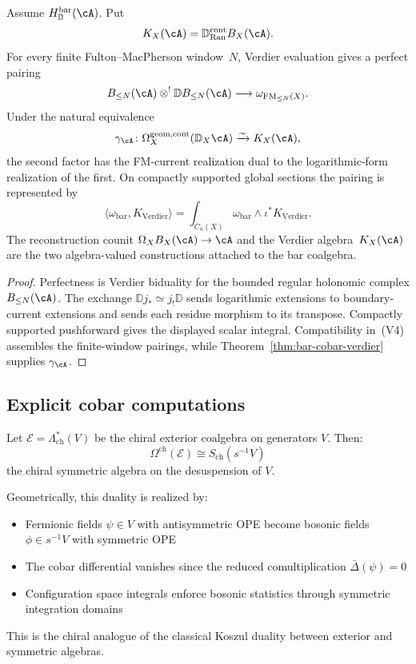 \begin{theorem}\label{thm:poincare-verdier}
Assume $H_{\mathbb D}^{\mathrm{bar}}(\cA)$.  Put
\[
K_X(\cA)=\mathbb D_{\operatorname{Ran}}^{\mathrm{cont}}B_X(\cA).
\]
For every finite Fulton--MacPherson window~$N$, Verdier evaluation gives
a perfect pairing
\[
B_{\leq N}(\cA)\otimes^!
\mathbb D B_{\leq N}(\cA)\longrightarrow
\omega_{\mathrm{FM}_{\leq N}(X)}.
\]
Under the natural equivalence
\[
\gamma_\cA\colon
\Omega_X^{\mathrm{geom,cont}}(\mathbb D_X\cA)
\xrightarrow{\sim}K_X(\cA),
\]
the second factor has the FM-current realization dual to the
logarithmic-form realization of the first.  On compactly supported
global sections the pairing is represented by
\[
\langle\omega_{\mathrm{bar}},K_{\mathrm{Verdier}}\rangle
=\int_{\overline C_n(X)}
\omega_{\mathrm{bar}}\wedge\iota^*K_{\mathrm{Verdier}}.
\]
The reconstruction counit
$\Omega_XB_X(\cA)\to\cA$ and the Verdier algebra~$K_X(\cA)$ are the
two algebra-valued constructions attached to the bar coalgebra.
\end{theorem}

\begin{proof}
Perfectness is Verdier biduality for the bounded regular holonomic
complex $B_{\leq N}(\cA)$.  The exchange
$\mathbb D j_*\simeq j_!\mathbb D$ sends logarithmic extensions to
boundary-current extensions and sends each residue morphism to its
transpose.  Compactly supported pushforward gives the displayed scalar
integral.  Compatibility in~\textup{(V4)} assembles the finite-window
pairings, while Theorem~\ref{thm:bar-cobar-verdier} supplies
$\gamma_\cA$.
\end{proof}

\subsection{Explicit cobar computations}

\begin{example}\label{ex:cobar-exterior}
Let $\mathcal{E} = \Lambda^*_{\text{ch}}(V)$ be the chiral exterior coalgebra on generators $V$. Then:
\[
\Omega^{\text{ch}}(\mathcal{E}) \cong S_{\text{ch}}(s^{-1}V)
\]
the chiral symmetric algebra on the desuspension of $V$.

Geometrically, this duality is realized by:
\begin{itemize}
\item Fermionic fields $\psi \in V$ with antisymmetric OPE become bosonic fields $\phi \in s^{-1}V$ with symmetric OPE
\item The cobar differential vanishes since the reduced comultiplication $\bar{\Delta}(\psi) = 0$
\item Configuration space integrals enforce bosonic statistics through symmetric integration domains
\end{itemize}

This is the chiral analogue of the classical Koszul duality between exterior and symmetric algebras.
\end{example}

